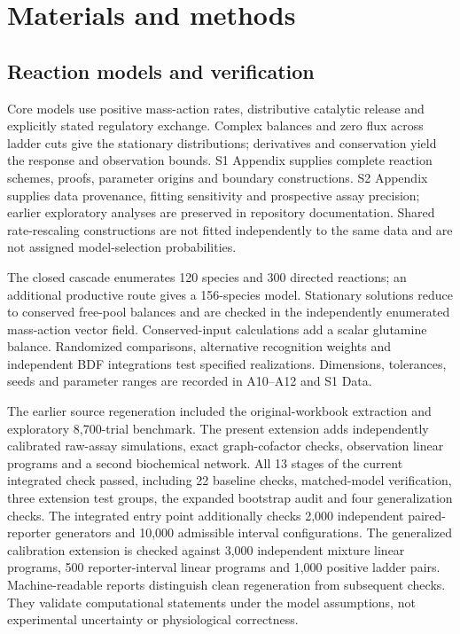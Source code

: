 \documentclass[10pt,letterpaper]{article}
\begin{document}
\section*{Materials and methods}

\subsection*{Reaction models and verification}

Core models use positive mass-action rates, distributive catalytic release and explicitly stated regulatory exchange. Complex balances and zero flux across ladder cuts give the stationary distributions; derivatives and conservation yield the response and observation bounds. S1 Appendix supplies complete reaction schemes, proofs, parameter origins and boundary constructions. S2 Appendix supplies data provenance, fitting sensitivity and prospective assay precision; earlier exploratory analyses are preserved in repository documentation. Shared rate-rescaling constructions are not fitted independently to the same data and are not assigned model-selection probabilities.

The closed cascade enumerates 120 species and 300 directed reactions; an additional productive route gives a 156-species model. Stationary solutions reduce to conserved free-pool balances and are checked in the independently enumerated mass-action vector field. Conserved-input calculations add a scalar glutamine balance. Randomized comparisons, alternative recognition weights and independent BDF integrations test specified realizations. Dimensions, tolerances, seeds and parameter ranges are recorded in A10--A12 and S1 Data.

The earlier source regeneration included the original-workbook extraction and exploratory 8,700-trial benchmark. The present extension adds independently calibrated raw-assay simulations, exact graph-cofactor checks, observation linear programs and a second biochemical network. All 13 stages of the current integrated check passed, including 22 baseline checks, matched-model verification, three extension test groups, the expanded bootstrap audit and four generalization checks. The integrated entry point additionally checks 2,000 independent paired-reporter generators and 10,000 admissible interval configurations. The generalized calibration extension is checked against 3,000 independent mixture linear programs, 500 reporter-interval linear programs and 1,000 positive ladder pairs. Machine-readable reports distinguish clean regeneration from subsequent checks. They validate computational statements under the model assumptions, not experimental uncertainty or physiological correctness.
\end{document}
